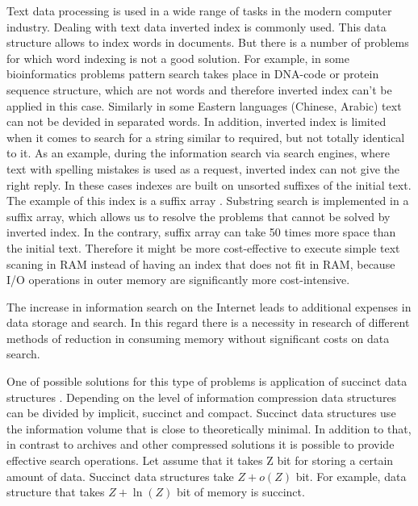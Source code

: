 

Text data processing is used in a wide range of tasks in the modern computer industry.
Dealing with text data inverted index \cite{zobel2006inverted} is commonly used. This data structure
allows to index words in documents. But there is a number of problems for which word indexing is not a good solution.
For example, in some bioinformatics problems \cite{tsuruoka2008facta} pattern search takes place in DNA-code or protein sequence structure,
which are not words and therefore inverted index can't be applied in this case.
Similarly in some Eastern languages (Chinese, Arabic) text can not be devided in separated words.
In addition, inverted index is limited when it comes to search for a string similar to required, but not totally identical to it.
As an example, during the information search via search engines, where text with spelling mistakes is used as a request, 
inverted index can not give the right reply.
In these cases indexes are built on unsorted suffixes of the initial text.
The example of this index is a suffix array \cite{manber1993suffix}.
Substring search is implemented in a suffix array, which allows us to resolve the problems that cannot be solved by inverted index.
In the contrary, suffix array can take 50 times more space than the initial text.
Therefore it might be more cost-effective to execute simple text scaning in RAM 
instead of having an index that does not fit in RAM, because I/O operations in outer memory are significantly more cost-intensive.

The increase in information search on the Internet leads to additional expenses in data storage and search.
In this regard there is a necessity in research of different methods of reduction in consuming memory without 
significant costs on data search.

One of possible solutions for this type of problems is application of succinct data structures \cite{jacobson1988succinct}.
Depending on the level of information compression data structures can be divided by implicit, succinct and compact.
Succinct data structures use the information volume that is close to theoretically minimal.
In addition to that, in contrast to archives and other compressed solutions 
it is possible to provide effective search operations.
Let assume that it takes Z bit for storing a certain amount of data.
Succinct data structures take \(Z + o(Z)\) bit. 
For example, data structure that takes \(Z + \ln(Z)\) bit of memory is succinct.

